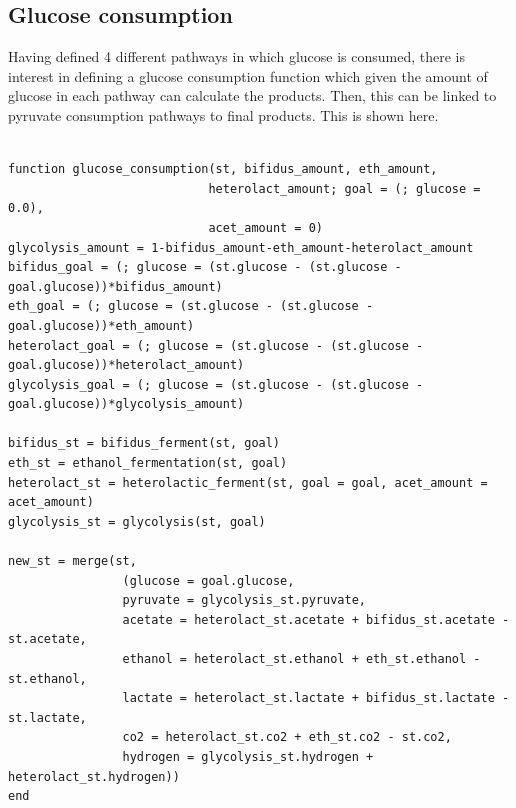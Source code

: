 \documentclass[11pt]{article}
\begin{document}
\subsection{Glucose consumption}
\label{sec:org622afbb}
Having defined 4 different pathways in which glucose is consumed, there is interest in defining a glucose consumption function which given the amount of glucose in each pathway can calculate the products. Then, this can be linked to pyruvate consumption pathways to final products. This is shown here.

\begin{verbatim}

function glucose_consumption(st, bifidus_amount, eth_amount,
                            heterolact_amount; goal = (; glucose = 0.0),
                            acet_amount = 0)
glycolysis_amount = 1-bifidus_amount-eth_amount-heterolact_amount
bifidus_goal = (; glucose = (st.glucose - (st.glucose - goal.glucose))*bifidus_amount)
eth_goal = (; glucose = (st.glucose - (st.glucose - goal.glucose))*eth_amount)
heterolact_goal = (; glucose = (st.glucose - (st.glucose - goal.glucose))*heterolact_amount)
glycolysis_goal = (; glucose = (st.glucose - (st.glucose - goal.glucose))*glycolysis_amount)

bifidus_st = bifidus_ferment(st, goal)
eth_st = ethanol_fermentation(st, goal)
heterolact_st = heterolactic_ferment(st, goal = goal, acet_amount = acet_amount)
glycolysis_st = glycolysis(st, goal)

new_st = merge(st,
                (glucose = goal.glucose,
                pyruvate = glycolysis_st.pyruvate,
                acetate = heterolact_st.acetate + bifidus_st.acetate - st.acetate,
                ethanol = heterolact_st.ethanol + eth_st.ethanol - st.ethanol,
                lactate = heterolact_st.lactate + bifidus_st.lactate - st.lactate,
                co2 = heterolact_st.co2 + eth_st.co2 - st.co2,
                hydrogen = glycolysis_st.hydrogen + heterolact_st.hydrogen))
end

\end{verbatim}
\end{document}
